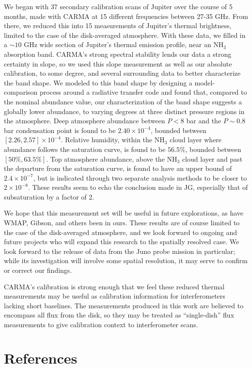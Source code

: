 \documentclass{article}
\newcommand{\e}[1]{\times 10^{#1}}
\begin{document}
	We began with 37 secondary calibration scans of Jupiter over the course of 5 months, made with CARMA at 15 different frequencies between 27-35 GHz.
	From there, we reduced this into 15 measurements of Jupiter's thermal brightness, limited to the case of the disk-averaged atmosphere.
	With these data, we filled in a $\sim 10$ GHz wide section of Jupiter's thermal emission profile, near an NH$_{3}$ absorption band.
	CARMA's strong spectral stability lends our data a strong certainty in slope, so we used this slope measurement as well as our absolute calibration, to some degree, and several surrounding data to better characterize the band shape.
	We modeled to this band shape by designing a model-comparison process around a radiative transfer code and found that, compared to the nominal abundance value, our characterization of the band shape suggests a globally lower abundance, to varying degrees at three distinct pressure regions in the atmosphere.
	Deep atmosphere abundance between $P < 8$ bar and the $P \sim 0.8$ bar condensation point is found to be $2.40\e{-4}$, bounded between $[2.26, 2.57] \e{-4}$.
	Relative humidity, within the NH$_{3}$ cloud layer where abundance follows the saturation curve, is found to be $56.5\%$, bounded between $[50\%, 63.5\%]$.
	Top atmosphere abundance, above the NH$_{3}$ cloud layer and past the departure from the saturation curve, is found to have an upper bound of $2.4\e{-7}$, but is indicated through two separate analysis methods to be closer to $2\e{-8}$.
	These results seem to echo the conclusion made in JG, especially that of subsaturation by a factor of 2.

	We hope that this measurement set will be useful in future explorations, as have WMAP, Gibson, and others been in ours.
	These results are of course limited to the case of the disk-averaged atmosphere, and we look forward to ongoing and future projects who will expand this research to the spatially resolved case.
	We look forward to the release of data from the Juno probe mission in particular; while its investigation will involve some spatial resolution, it may serve to confirm or correct our findings.

	CARMA's calibration is strong enough that we feel these reduced thermal measurements may be useful as calibration information for interferometers lacking short baselines.
	The measurements produced in this work are believed to encompass all flux from the disk, so they may be treated as ``single-dish'' flux measurements to give calibration context to interferometer scans.



\section{References}



\end{document}
